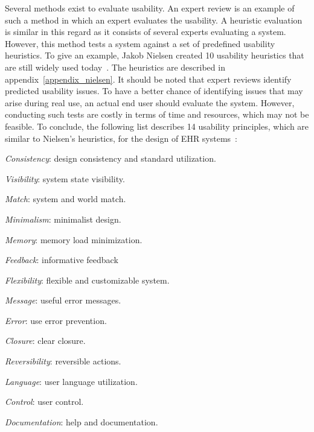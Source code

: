     Several methods exist to evaluate usability. An expert review is an example of such a method in which an expert evaluates the usability. A heuristic evaluation is similar in this regard as it consists of several experts evaluating a system. However, this method tests a system against a set of predefined usability heuristics. To give an example, Jakob Nielsen created 10 usability heuristics that are still widely used today~\cite{Nielsen1993}. The heuristics are described in appendix~\ref{appendix_nielsen}. It should be noted that expert reviews identify predicted usability issues. To have a better chance of identifying issues that may arise during real use, an actual end user should evaluate the system. However, conducting such tests are costly in terms of time and resources, which may not be feasible. To conclude, the following list describes 14 usability principles, which are similar to Nielsen's heuristics, for the design of EHR systems~\cite{Middleton2013}:
    \begin{multicols}{2}
        \begin{myenumerate}
            \item \emph{Consistency}: design consistency and standard utilization.
            \item \emph{Visibility}: system state visibility.
            \item \emph{Match}: system and world match.
            \item \emph{Minimalism}: minimalist design.
            \item \emph{Memory}: memory load minimization.
            \item \emph{Feedback}: informative feedback
            \item \emph{Flexibility}: flexible and customizable system.
            \item \emph{Message}: useful error messages.
            \item \emph{Error}: use error prevention.
            \item \emph{Closure}: clear closure.
            \item \emph{Reversibility}: reversible actions.
            \item \emph{Language}: user language utilization.
            \item \emph{Control}: user control.
            \item \emph{Documentation}: help and documentation.
        \end{myenumerate}
    \end{multicols}

